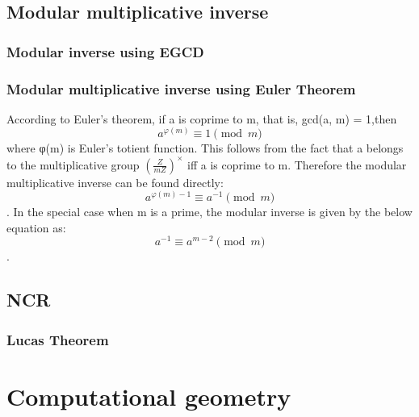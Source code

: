 \documentclass[11pt]{report}
\begin{document}
\section{Modular multiplicative inverse}
\subsection{Modular inverse using EGCD}

\subsection{Modular multiplicative inverse using Euler Theorem}
According to Euler's theorem, if a is coprime to m, that is, gcd(a, m) = 1,then
$$a^{\varphi(m)} \equiv 1 \pmod{m}$$
where φ(m) is Euler's totient function. This follows from the fact that a belongs to the multiplicative group $(\frac{Z}{mZ})^×$ iff a is coprime to m. Therefore the modular multiplicative inverse can be found directly:
$$a^{\varphi(m)-1} \equiv a^{-1} \pmod{m}$$.
In the special case when m is a prime, the modular inverse is given by the below equation as:
$$a^{-1} \equiv a^{m-2} \pmod{m}$$.
\section{NCR}
\subsection{Lucas Theorem}



\chapter{Computational geometry}

\end{document}
